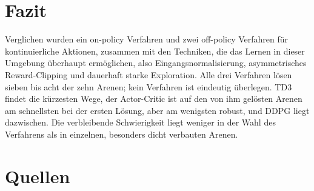 \documentclass[11pt,a4paper]{article}
\begin{document}
\section{Fazit}
Verglichen wurden ein on-policy Verfahren und zwei off-policy Verfahren für kontinuierliche
Aktionen, zusammen mit den Techniken, die das Lernen in dieser Umgebung überhaupt ermöglichen,
also Eingangsnormalisierung, asymmetrisches Reward-Clipping und dauerhaft starke Exploration.
Alle drei Verfahren lösen sieben bis acht der zehn Arenen; kein Verfahren ist eindeutig
überlegen. TD3 findet die kürzesten Wege, der Actor-Critic ist auf den von ihm
gelösten Arenen am schnellsten bei der ersten Lösung, aber am wenigsten robust, und DDPG liegt
dazwischen. Die verbleibende Schwierigkeit liegt weniger in der Wahl des Verfahrens als in
einzelnen, besonders dicht verbauten Arenen.

\section{Quellen}
\nocite{*}
\printbibliography
\end{document}
